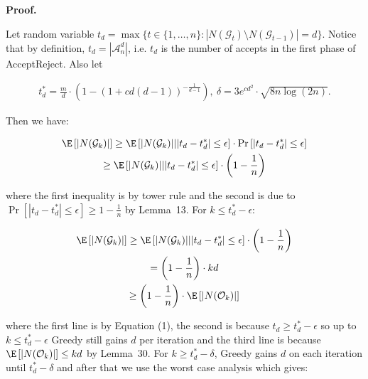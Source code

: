 


\par\medskip\noindent\textbf{Proof.}\par



Let random variable $t_{d}=\max\{t\in\{1,\dots,n\}:|N(\mathcal{G}_{t})\setminus N(\mathcal{G}_{t-1})|=d\}$.
Notice that by definition, $t_{d}=|\mathcal{A}^{d}_{n}|$, i.e. $t_{d}$ is the number of accepts in the first phase of AcceptReject.
Also let\par


\[\begin{gathered}
\displaystyle t^{*}_{d}=\frac{m}{d}\cdot\left(1-\left(1+cd(d-1)\right)^{-\frac{1}{d-1}}\right),\ \delta=3e^{cd^{2}}\cdot\sqrt{8n\log(2n)}.
\end{gathered}\]


Then we have:\par


\[\begin{gathered}
\displaystyle\E\left[|N(\mathcal{G}_{k})|\right] \displaystyle\geq\E\left[|N(\mathcal{G}_{k})|\middle||t_{d}-t^{*}_{d}|\leq\epsilon\right]\cdot\Pr\left[|t_{d}-t^{*}_{d}|\leq\epsilon\right] \\
\displaystyle\geq\E\left[|N(\mathcal{G}_{k})|\middle||t_{d}-t^{*}_{d}|\leq\epsilon\right]\cdot\left(1-\frac{1}{n}\right)
\end{gathered}\]


where the first inequality is by tower rule and the second is due to $\Pr\left[|t_{d}-t^{*}_{d}|\leq\epsilon\right]\geq 1-\frac{1}{n}$ by Lemma 13.
For $k\leq t^{*}_{d}-\epsilon$:\par


\[\begin{gathered}
\displaystyle\E\left[|N(\mathcal{G}_{k})|\right] \displaystyle\geq\E\left[|N(\mathcal{G}_{k})|\middle||t_{d}-t^{*}_{d}|\leq\epsilon\right]\cdot\left(1-\frac{1}{n}\right) \\
\displaystyle=\left(1-\frac{1}{n}\right)\cdot kd \\
\displaystyle\geq\left(1-\frac{1}{n}\right)\cdot\E\left[|N(\mathcal{O}_{k})|\right]
\end{gathered}\]


where the first line is by Equation (1), the second is because $t_{d}\geq t^{*}_{d}-\epsilon$ so up to $k\leq t^{*}_{d}-\epsilon$ Greedy still gains $d$ per iteration and the third line is because $\E\left[|N(\mathcal{O}_{k})|\right]\leq kd$ by Lemma 30.
For $k\geq t^{*}_{d}-\delta$, Greedy gains $d$ on each iteration until $t^{*}_{d}-\delta$ and after that we use the worst case analysis which gives:\par


